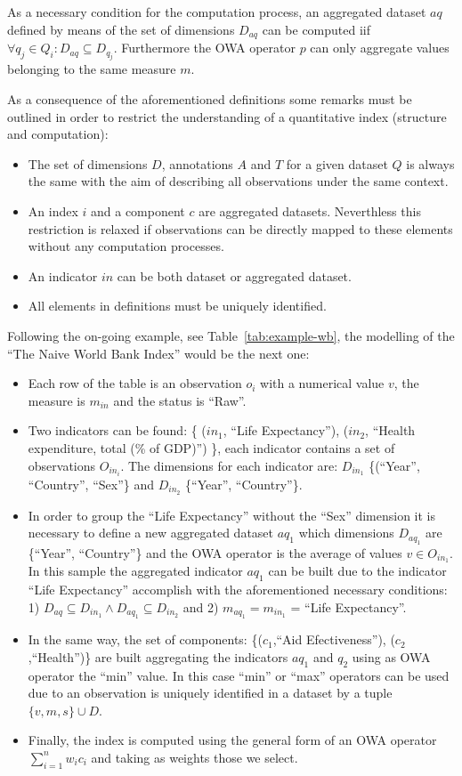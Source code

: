\documentclass{llncs}
\begin{document}
As a necessary condition for the computation process, an aggregated dataset $aq$ defined by means of the set of dimensions $D_{aq}$ can be computed iif 
$\forall q_j \in Q_i: D_{aq} \subseteq D_{q_j}$. Furthermore the OWA operator $p$ can only aggregate values belonging to the same measure $m$.


As a consequence of the aforementioned definitions some remarks must be outlined in order to restrict the understanding of 
a quantitative index (structure and computation):
\begin{itemize}
 \item The set of dimensions $D$, annotations $A$ and $T$ for a given dataset $Q$ is always the same with the aim of describing all observations under 
 the same context.
 \item An index $i$ and a component $c$ are aggregated datasets. Neverthless this restriction is relaxed if observations can be directly mapped to 
 these elements without any computation processes.
 \item An indicator $in$ can be both dataset or aggregated dataset.
 \item All elements in definitions must be uniquely identified. 
\end{itemize}

Following the on-going example, see Table~\ref{tab:example-wb}, the modelling of the ``The Naive World Bank Index'' would be the next one:
\begin{itemize}
 \item Each row of the table is an observation $o_i$ with a numerical value $v$, the measure is $m_{in}$ and the status is ``Raw''.
 \item Two indicators can be found: \{ ($in_1$, ``Life Expectancy''), ($in_2$, ``Health expenditure, total (\% of GDP)'') \}, each indicator contains a set 
 of observations $O_{in_i}$. The dimensions for each indicator are: $D_{in_1}$  \{(``Year'', ``Country'', ``Sex''\} and $D_{in_2}$ \{``Year'', ``Country''\}.
 \item In order to group the ``Life Expectancy'' without the ``Sex'' dimension it is necessary to define a new aggregated dataset $aq_1$ which 
 dimensions $D_{aq_1}$ are \{``Year'', ``Country''\} and the OWA operator is the average of values $v \in O_{in_1}$. In this sample the aggregated indicator $aq_1$
 can be built due to the indicator ``Life Expectancy'' accomplish with the aforementioned necessary conditions: 1) $D_{aq} \subseteq D_{in_1} \wedge D_{aq_1} \subseteq D_{in_2}$ and 
 2) $m_{aq_1}= m_{in_1}$ = ``Life Expectancy''.
 \item In the same way, the set of components: \{($c_1$,``Aid Efectiveness''), ($c_2$,``Health'')\} are built aggregating the indicators $aq_1$ and 
 $q_2$ using as OWA operator the ``min'' value. In this case ``min'' or ``max'' operators can be used due to an observation is uniquely identified in a 
 dataset by a tuple $\{v,m,s\} \cup D$.
 \item Finally, the index is computed using the general form of an OWA operator $\sum_{i=1}^n  w_i c_i$ and taking as weights those we select.
\end{itemize}
\end{document}
